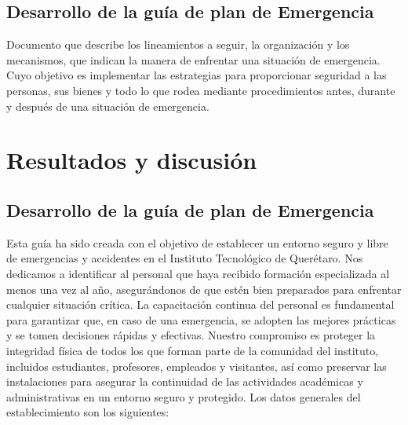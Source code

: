     
    \subsection{Desarrollo de la guía de plan de Emergencia}
    
    Documento que describe los lineamientos a seguir, la organización y los mecanismos, que indican la manera de enfrentar una situación de emergencia. Cuyo objetivo es implementar las estrategias para proporcionar seguridad a las personas, sus bienes y todo lo que rodea mediante procedimientos antes, durante y después de una situación de emergencia.
    
    
    
    
    
    
    
    
    \section{Resultados y discusión}
    
    \subsection{Desarrollo de la guía de plan de Emergencia}
    
    Esta guía ha sido creada con el objetivo de establecer un entorno seguro y libre de emergencias y accidentes en el Instituto Tecnológico de Querétaro. Nos dedicamos a identificar al personal que haya recibido formación especializada al menos una vez al año, asegurándonos de que estén bien preparados para enfrentar cualquier situación crítica. La capacitación continua del personal es fundamental para garantizar que, en caso de una emergencia, se adopten las mejores prácticas y se tomen decisiones rápidas y efectivas. Nuestro compromiso es proteger la integridad física de todos los que forman parte de la comunidad del instituto, incluidos estudiantes, profesores, empleados y visitantes, así como preservar las instalaciones para asegurar la continuidad de las actividades académicas y administrativas en un entorno seguro y protegido.
    Los datos generales del establecimiento son los siguientes:
    
